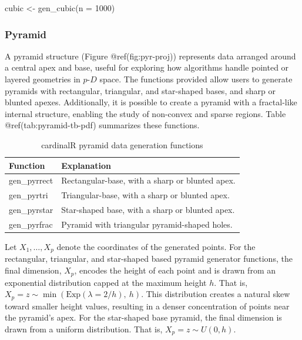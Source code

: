 \documentclass[
  11pt,
  a4paper,
]{report}
\newenvironment{Shaded}{\begin{snugshade}}{\end{snugshade}}
\newcommand{\AttributeTok}[1]{\textcolor[rgb]{0.40,0.45,0.13}{#1}}
\newcommand{\DecValTok}[1]{\textcolor[rgb]{0.68,0.00,0.00}{#1}}
\newcommand{\FunctionTok}[1]{\textcolor[rgb]{0.28,0.35,0.67}{#1}}
\newcommand{\NormalTok}[1]{\textcolor[rgb]{0.00,0.23,0.31}{#1}}
\newcommand{\OtherTok}[1]{\textcolor[rgb]{0.00,0.23,0.31}{#1}}
\newcommand\pD{$p\text{-}D$}
\begin{document}
\begin{Shaded}
\begin{Highlighting}[]
\NormalTok{cubic }\OtherTok{\textless{}{-}} \FunctionTok{gen\_cubic}\NormalTok{(}\AttributeTok{n =} \DecValTok{1000}\NormalTok{)}
\end{Highlighting}
\end{Shaded}

\subsubsection{Pyramid}\label{pyramid}

A pyramid structure (Figure @ref(fig:pyr-proj)) represents data arranged
around a central apex and base, useful for exploring how algorithms
handle pointed or layered geometries in \pD{} space. The functions
provided allow users to generate pyramids with rectangular, triangular,
and star-shaped bases, and sharp or blunted apexes. Additionally, it is
possible to create a pyramid with a fractal-like internal structure,
enabling the study of non-convex and sparse regions. Table
@ref(tab:pyramid-tb-pdf) summarizes these functions.

\begin{table}

\caption{\label{tab:pyramid-tb-pdf}cardinalR pyramid data generation functions}
\centering
\begin{tabular}[t]{>{\raggedright\arraybackslash}p{4cm}>{\raggedright\arraybackslash}p{8cm}}
\toprule
Function & Explanation\\
\midrule
gen\_pyrrect & Rectangular-base, with a sharp or blunted apex.\\
gen\_pyrtri & Triangular-base, with a sharp or blunted apex.\\
gen\_pyrstar & Star-shaped base, with a sharp or blunted apex.\\
gen\_pyrfrac & Pyramid with triangular pyramid-shaped holes.\\
\bottomrule
\end{tabular}
\end{table}

Let \(X_1, \dots, X_p\) denote the coordinates of the generated points.
For the rectangular, triangular, and star-shaped based pyramid generator
functions, the final dimension, \(X_p\), encodes the height of each
point and is drawn from an exponential distribution capped at the
maximum height \(h\). That is,
\(X_p = z \sim \min\left(\text{Exp}(\lambda = 2/h),\ h\right).\) This
distribution creates a natural skew toward smaller height values,
resulting in a denser concentration of points near the pyramid's apex.
For the star-shaped base pyramid, the final dimension is drawn from a
uniform distribution. That is, \(X_p = z \sim U(0, h)\).
\end{document}
